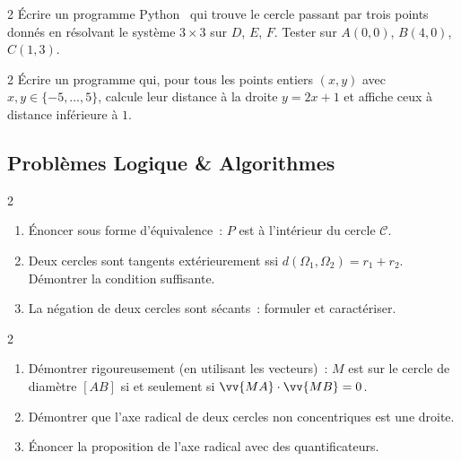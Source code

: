 \begin{exo}{2}
\'Ecrire un programme Python \computer\ qui trouve le cercle passant par trois
points donn\'es en r\'esolvant le syst\`eme $3\times3$ sur $D$, $E$, $F$.
Tester sur $A(0,0)$, $B(4,0)$, $C(1,3)$.
\end{exo}

\begin{exo}{2}
\'Ecrire un programme qui, pour tous les points entiers $(x,y)$
avec $x,y\in\{-5,\ldots,5\}$, calcule leur distance \`a la droite $y=2x+1$
et affiche ceux \`a distance inf\'erieure \`a $1$.
\end{exo}

\subsection*{Probl\`emes Logique \& Algorithmes}

\begin{probleme}{2}
\begin{enumerate}
  \item \'Enoncer sous forme d'\'equivalence~:
        \og $P$ est \`a l'int\'erieur du cercle $\mathcal{C}$.\fg
  \item Deux cercles sont tangents ext\'erieurement ssi $d(\Omega_1,\Omega_2)=r_1+r_2$.
        D\'emontrer la condition suffisante.
  \item La n\'egation de \og deux cercles sont s\'ecants\fg~: formuler et caract\'eriser.
\end{enumerate}
\end{probleme}

\begin{probleme}{2}
\begin{enumerate}
  \item D\'emontrer rigoureusement (en utilisant les vecteurs)~:
        $M$ est sur le cercle de diam\`etre $[AB]$ si et seulement si $\vv{MA}\cdot\vv{MB}=0$.
  \item D\'emontrer que l'axe radical de deux cercles non concentriques
        est une droite.
  \item \'Enoncer la proposition de l'axe radical avec des quantificateurs.
\end{enumerate}
\end{probleme}

